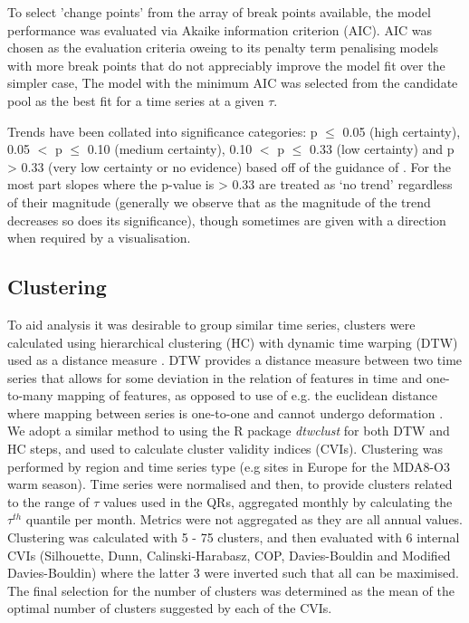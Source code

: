 \documentclass[journal abbreviation, manuscript]{copernicus}
\begin{document}
To select 'change points' from the array of break points available, the model performance was evaluated via Akaike information criterion (AIC). AIC was chosen as the evaluation criteria oweing to its penalty term penalising models with more break points that do not appreciably improve the model fit over the simpler case, The model with the minimum AIC was selected from the candidate pool as the best fit for a time series at a given $\tau$. 

Trends have been collated into significance categories: p $\le$ 0.05 (high certainty), 0.05 $<$ p $\le$ 0.10 (medium certainty), 0.10 $<$ p $\le$ 0.33 (low certainty) and p > 0.33 (very low certainty or no evidence) based off of the guidance of \cite{chang2023guidancenotebeststatistical}. For the most part slopes where the p-value is > 0.33 are treated as ‘no trend’ regardless of their magnitude (generally we observe that as the magnitude of the trend decreases so does its significance), though sometimes are given with a direction when required by a visualisation.

\subsection{Clustering}
To aid analysis it was desirable to group similar time series, clusters were calculated using hierarchical clustering (HC) with dynamic time warping (DTW) used as a distance measure \citep{AGHABOZORGI201516}. DTW provides a distance measure between two time series that allows for some deviation in the relation of features in time and one-to-many mapping of features, as opposed to use of e.g. the euclidean distance where mapping between series is one-to-one and cannot undergo deformation \citep{Berndt_dtw, Abdullah_Keogh_dtw}. We adopt a similar method to \cite{REED2025110686} using the R package \emph{dtwclust} \citep{dtwclust} for both DTW and HC steps, and used to calculate cluster validity indices (CVIs). Clustering was performed by region and time series type (e.g sites in Europe for the MDA8-O3 warm season). Time series were normalised and then, to provide clusters related to the range of $\tau$ values used in the QRs, aggregated monthly by calculating the $\tau^{th}$ quantile per month. Metrics were not aggregated as they are all annual values. Clustering was calculated with 5 - 75 clusters, and then evaluated with 6 internal CVIs (Silhouette, Dunn, Calinski-Harabasz, COP, Davies-Bouldin and Modified Davies-Bouldin) where the latter 3 were inverted such that all can be maximised. The final selection for the number of clusters was determined as the mean of the optimal number of clusters suggested by each of the CVIs. 
\end{document}
